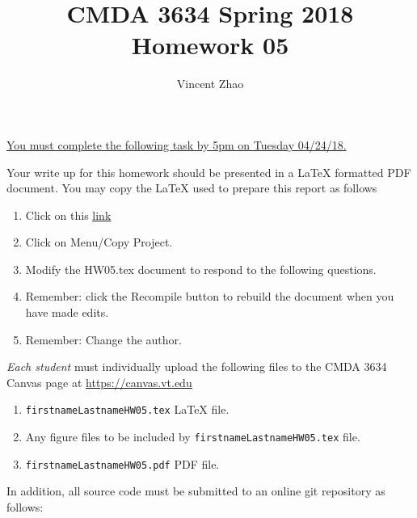 \documentclass{article}
\newcommand{\pad}{\vspace{8pt}\noindent}
\newcommand{\myhref}[2]{\href{#1}{\color{foo}\underline{#2}\color{black}}}
\begin{document}
\title{CMDA 3634 Spring 2018 Homework 05}

\author{Vincent Zhao}
\vspace{-64pt}\maketitle
\begin{center}\underline{You must complete the following task by 5pm on Tuesday 04/24/18.}\end{center}
Your write up for this homework should be presented in a {\LaTeX} formatted PDF document. You may copy the \LaTeX{} used to prepare this report as follows

\begin{enumerate}
\item Click on this  \myhref{https://www.sharelatex.com/read/cyvqcnwmfnsc}{link} 
\item Click on Menu/Copy Project.
\item Modify the HW05.tex document to respond to the following questions. 
\item Remember: click the Recompile button to rebuild the document when you have made edits.
\item Remember: Change the author. 

\end{enumerate}

\pad \emph{Each student} must individually upload the following files to the CMDA 3634 Canvas page at \myhref{https://canvas.vt.edu}{https://canvas.vt.edu}

\begin{enumerate}
\item \verb|firstnameLastnameHW05.tex| {\LaTeX} file.
\item Any figure files to be included by \verb|firstnameLastnameHW05.tex| file.
\item \verb|firstnameLastnameHW05.pdf| PDF file.
\end{enumerate}

\noindent In addition, all source code must be submitted to an online git repository as follows:
\end{document}
